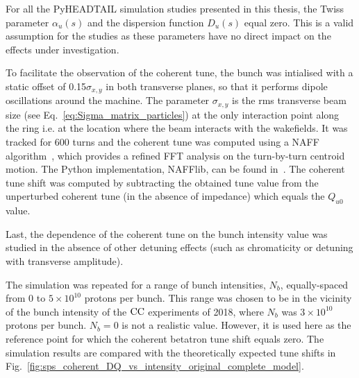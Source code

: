 For all the PyHEADTAIL simulation studies presented in this thesis, the Twiss parameter $\alpha_u(s)$ and the dispersion function $D_u(s)$ equal zero. This is a valid assumption for the studies as these parameters have no direct impact on the effects under investigation.

To facilitate the observation of the coherent tune, the bunch was intialised with a static offset of 0.15$\sigma_{x,y}$ in both transverse planes, so that it performs dipole oscillations around the machine. The parameter $\sigma_{x,y}$ is the rms transverse beam size (see Eq.~\eqref{eq:Sigma_matrix_particles}) at the only interaction point along the ring i.e. at the location where the beam interacts with the wakefields. It was tracked for 600 turns and the coherent tune was computed using a NAFF algorithm~\cite{LASKAR1990266, Kostoglou:2289645}, which provides a refined FFT analysis on the turn-by-turn centroid motion.  The Python implementation, NAFFlib, can be found in~\cite{nafflib_repository}. The coherent tune shift was computed by subtracting the obtained tune value from the unperturbed coherent tune (in the absence of impedance) which equals the $Q_{u0}$ value.

Last, the dependence of the coherent tune on the bunch intensity value was studied in the absence of other detuning effects (such as chromaticity or detuning with transverse amplitude). %

The simulation was repeated for a range of bunch intensities, $N_b$, equally-spaced from 0 to $5 \times 10^{10}$ protons per bunch. This range was chosen to be in the vicinity of the bunch intensity of the ${\mathrm{CC}}$ experiments of 2018, where $N_b$ was $3\times 10^{10}$ protons per bunch. $N_b=0$ is not a realistic value. However, it is used here as the reference point for which the coherent betatron tune shift equals zero. The simulation results are compared with the theoretically expected tune shifts in Fig.~\ref{fig:sps_coherent_DQ_vs_intensity_original_complete_model}.

